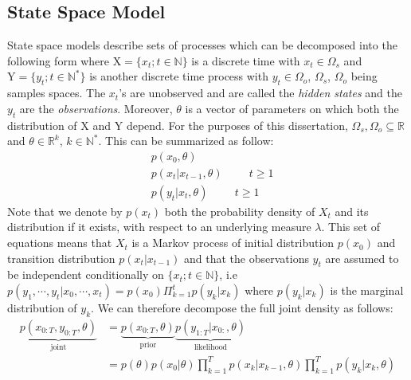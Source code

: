 \documentclass[12pt]{article}
\begin{document}
	\subsection{State Space Model}
	State space models describe sets of processes which can be decomposed into the following form where $\mathrm{X}=\{x_t ; t \in \mathbb{N}\}$ is a discrete time with $x_t \in \Omega_s$ and $\mathrm{Y}=\{y_t ; t \in \mathbb{N^*}\}$ is another discrete time process with $y_t \in \Omega_o$, $\Omega_s$, $\Omega_o$ being samples spaces. The $x_t$'s are unobserved and are called the \emph{hidden states} and the $y_t$ are the \emph{observations}. Moreover, $\theta$ is a vector of parameters on which both the distribution of $\mathrm{X}$ and $\mathrm{Y}$ depend. For the purposes of this dissertation, $\Omega_s, \Omega_o \subseteq \mathbb{R}$ and $\theta \in \mathbb{R}^k$, $k \in \mathbb{N^*}$. This can be summarized as follow: 
	\begin{align}
		& p(x_0, \theta) \\
		& p(x_t | x_{t-1}, \theta) \hspace{1cm} t \ge 1\\
		& p(y_t | x_t, \theta) \hspace{1cm} t \ge 1
	\end{align}
	Note that we denote by $p(x_t)$ both the probability density of $X_t$ and its distribution if it exists, with respect to an underlying measure $\lambda$. This set of equations means that $X_t$ is a Markov process of initial distribution $p(x_0)$ and transition distribution $p(x_t | x_{t-1})$ and that the observations $y_t$ are assumed to be independent conditionally on $\{x_t ; t \in \mathbb{N}\}$, i.e $p(y_1, \cdots, y_t | x_0, \cdots, x_t) =p(x_0)\Pi_{k=1}^t p(y_k | x_k)$ where $p(y_k | x_k)$ is the marginal distribution of $y_k$. We can therefore decompose the full joint density as follows:
	\begin{align}
	\underbrace{p(x_{0:T}, y_{0:T}, \theta)}_{\text{joint}} & = \underbrace{p(x_{0:T}, \theta)}_{\text{prior}}\underbrace{p(y_{1:T}| x_{0:}, \theta)}_{\text{likelihood}} \\
		& = p(\theta)p(x_0| \theta)\prod_{k=1}^{T}p(x_k|x_{k-1}, \theta)\prod_{k=1}^{T}p(y_k|x_k, \theta)
	\end{align}\\
	
\end{document}
